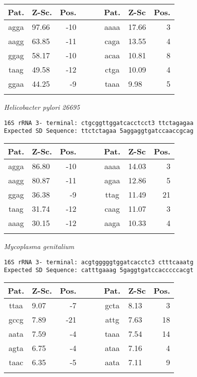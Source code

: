 \noindent
\begin{center}
\begin{tabular}{clrcclr}
Pat. & Z-Sc. & Pos. & \verb+   + & Pat. & Z-Sc & Pos. \\
\hline
agga & 97.66 & -10 &  & aaaa & 17.66 & 3 \\
aagg & 63.85 & -11 &  & caga & 13.55 & 4 \\
ggag & 58.17 & -10 &  & acaa & 10.81 & 8 \\
taag & 49.58 & -12 &  & ctga & 10.09 & 4 \\
ggaa & 44.25 & -9 &  & taaa & 9.98 & 5 \\
    &     \\
\end{tabular}
\end{center}

\vspace{1em}
\noindent
{\it Helicobacter pylori 26695   }
\begin{verbatim}
16S rRNA 3- terminal: ctgcggttggatcacctcct3 ttctagagaa
Expected SD Sequence: ttctctagaa 5aggaggtgatccaaccgcag
\end{verbatim}

\noindent
\begin{center}
\begin{tabular}{clrcclr}
Pat. & Z-Sc. & Pos. & \verb+   + & Pat. & Z-Sc & Pos. \\
\hline
agga & 86.80 & -10 &  & aaaa & 14.03 & 3 \\
aagg & 80.87 & -11 &  & agaa & 12.86 & 5 \\
ggag & 36.38 & -9 &  & ttag & 11.49 & 21 \\
taag & 31.74 & -12 &  & caag & 11.07 & 3 \\
aaag & 30.15 & -12 &  & aaga & 10.33 & 4 \\
    &     \\
\end{tabular}
\end{center}

\vspace{1em}
\noindent
{\it Mycoplasma genitalium    }
\begin{verbatim}
16S rRNA 3- terminal: acgtgggggtggatcacctc3 ctttcaaatg
Expected SD Sequence: catttgaaag 5gaggtgatccacccccacgt
\end{verbatim}

\noindent
\begin{center}
\begin{tabular}{clrcclr}
Pat. & Z-Sc. & Pos. & \verb+   + & Pat. & Z-Sc & Pos. \\
\hline
ttaa & 9.07 & -7 &  & gcta & 8.13 & 3 \\
gccg & 7.89 & -21 &  & attg & 7.63 & 18 \\
aata & 7.59 & -4 &  & taaa & 7.54 & 14 \\
agta & 6.75 & -4 &  & ataa & 7.16 & 4 \\
taac & 6.35 & -5 &  & aata & 7.11 & 9 \\
    &     \\
\end{tabular}
\end{center}

